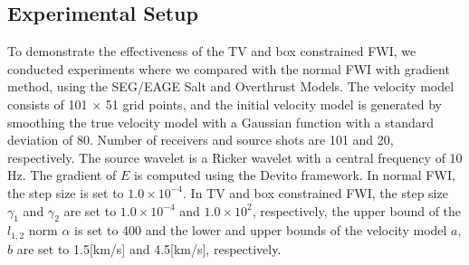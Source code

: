 \subsection{Experimental Setup}\label{subsec:experimental-setup}
%
%
%
To demonstrate the effectiveness of the TV and box constrained FWI, we conducted experiments where we compared with the normal FWI with gradient method, using the SEG/EAGE Salt and Overthrust Models.
The velocity model consists of 101 $\times$ 51 grid points, and the initial velocity model is generated by smoothing the true velocity model with a Gaussian function with a standard deviation of 80.
Number of receivers and source shots are 101 and 20, respectively.
The source wavelet is a Ricker wavelet with a central frequency of 10 Hz.
The gradient of $E$ is computed using the Devito framework\cite{devito}.
In normal FWI, the step size is set to $1.0 \times 10^{-4}$.
In TV and box constrained FWI, the step size $\gamma_1$ and $\gamma_2$ are set to $1.0 \times 10^{-4}$ and $1.0 \times 10^2$, respectively, the upper bound of the $l_{1,2}$ norm $\alpha$ is set to 400 and the lower and upper bounds of the velocity model $a$, $b$ are set to 1.5[km/s] and 4.5[km/s], respectively.




